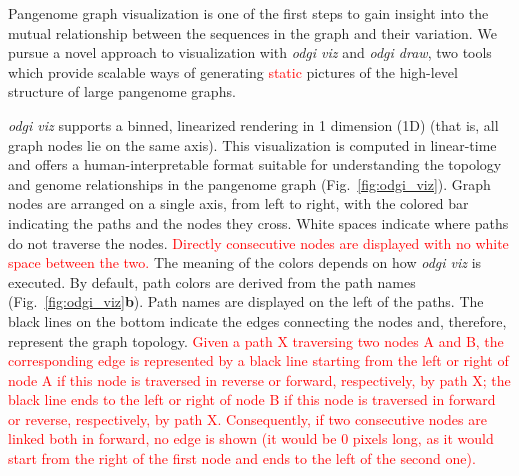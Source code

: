 \documentclass{bioinfo}
\newcommand{\REVIEWED}[1]{{\textcolor{Red}{#1}}}
\begin{document}
Pangenome graph visualization is one of the first steps to gain insight into the mutual relationship between the sequences in the graph and their variation.
We pursue a novel approach to visualization with \textit{odgi viz} and \textit{odgi draw}, two tools which provide scalable ways of generating \REVIEWED{static} pictures of the high-level structure of large pangenome graphs.

\textit{odgi viz} supports a binned, linearized rendering in 1 dimension (1D) (that is, all graph nodes lie on the same axis).
This visualization is computed in linear-time and offers a human-interpretable format suitable for understanding the topology and genome relationships in the pangenome graph (Fig.~\ref{fig:odgi_viz}).
Graph nodes are arranged on a single axis, from left to right, with the colored bar indicating the paths and the nodes they cross.
White spaces indicate where paths do not traverse the nodes.
\REVIEWED{Directly consecutive nodes are displayed with no white space between the two.}
The meaning of the colors depends on how \textit{odgi viz} is executed.
By default, path colors are derived from the path names (Fig.~\ref{fig:odgi_viz}\textbf{b}).
Path names are displayed on the left of the paths.
The black lines on the bottom indicate the edges connecting the nodes and, therefore, represent the graph topology.
\REVIEWED{Given a path X traversing two nodes A and B, the corresponding edge is represented by a black line starting from the left or right of node A if this node is traversed in reverse or forward, respectively, by path X;
the black line ends to the left or right of node B if this node is traversed in forward or reverse, respectively, by path X.
Consequently, if two consecutive nodes are linked both in forward, no edge is shown (it would be 0 pixels long, as it would start from the right of the first node and ends to the left of the second one).}
\end{document}
